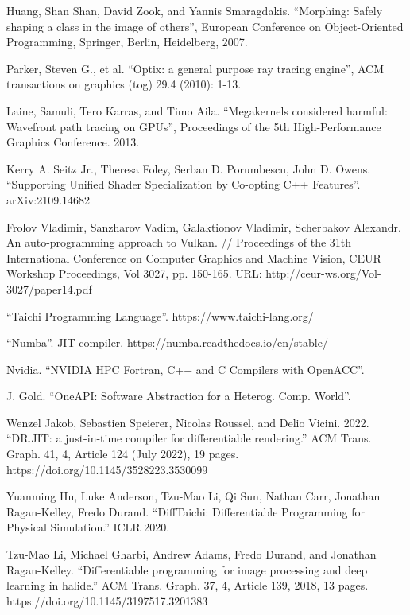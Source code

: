 \documentclass[11pt,fleqn,english,russian]{report} %
\begin{document}
\begin{thebibliography}{10}
	 Huang, Shan Shan, David Zook, and Yannis Smaragdakis. ``Morphing: Safely shaping a class in the image of others'', European Conference on Object-Oriented Programming, Springer, Berlin, Heidelberg, 2007. 
	
	 Parker, Steven G., et al. ``Optix: a general purpose ray tracing engine'', ACM transactions on graphics (tog) 29.4 (2010): 1-13.
	
	 Laine, Samuli, Tero Karras, and Timo Aila. ``Megakernels considered harmful: Wavefront path tracing on GPUs'', Proceedings of the 5th High-Performance Graphics Conference. 2013.
	
	 Kerry A. Seitz Jr., Theresa Foley, Serban D. Porumbescu, John D. Owens. ``Supporting Unified Shader Specialization by Co-opting C++ Features''. arXiv:2109.14682 
	
	 Frolov Vladimir, Sanzharov Vadim, Galaktionov Vladimir, Scherbakov Alexandr. An auto-programming approach to Vulkan. // Proceedings of the 31th International Conference on Computer Graphics and Machine Vision, CEUR Workshop Proceedings, Vol 3027, pp. 150-165. URL: http://ceur-ws.org/Vol-3027/paper14.pdf 
	
	 ``Taichi Programming Language''. https://www.taichi-lang.org/
	
	 ``Numba''. JIT compiler. https://numba.readthedocs.io/en/stable/
	
	 Nvidia. ``NVIDIA HPC Fortran, C++ and C Compilers with OpenACC''.
	
	 J. Gold. ``OneAPI: Software Abstraction for a Heterog. Comp. World''. 
	
	 Wenzel Jakob, Sebastien Speierer, Nicolas Roussel, and Delio Vicini. 2022. ``DR.JIT: a just-in-time compiler for differentiable rendering.'' ACM Trans. Graph. 41, 4, Article 124 (July 2022), 19 pages. https://doi.org/10.1145/3528223.3530099
	
	 Yuanming Hu, Luke Anderson, Tzu-Mao Li, Qi Sun, Nathan Carr, Jonathan Ragan-Kelley, Fredo Durand. ``DiffTaichi: Differentiable Programming for Physical Simulation.'' ICLR 2020.
	
	 Tzu-Mao Li, Michael Gharbi, Andrew Adams, Fredo Durand, and Jonathan Ragan-Kelley. ``Differentiable programming for image processing and deep learning in halide.'' ACM Trans. Graph. 37, 4, Article 139, 2018, 13 pages. https://doi.org/10.1145/3197517.3201383
	

\end{thebibliography}
\end{document}
